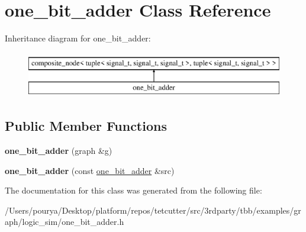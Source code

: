 \hypertarget{classone__bit__adder}{}\section{one\+\_\+bit\+\_\+adder Class Reference}
\label{classone__bit__adder}
Inheritance diagram for one\+\_\+bit\+\_\+adder\+:\begin{figure}[H]
\begin{center}
\leavevmode
\includegraphics[height=2.000000cm]{classone__bit__adder}
\end{center}
\end{figure}
\subsection*{Public Member Functions}
\begin{DoxyCompactItemize}
\item 
\hypertarget{classone__bit__adder_a98c1e1dfb1f1b4c7cf755eb5d6381bca}{}{\bfseries one\+\_\+bit\+\_\+adder} (graph \&g)\label{classone__bit__adder_a98c1e1dfb1f1b4c7cf755eb5d6381bca}

\item 
\hypertarget{classone__bit__adder_a69045764543d58db25c990690d3b2a0a}{}{\bfseries one\+\_\+bit\+\_\+adder} (const \hyperlink{classone__bit__adder}{one\+\_\+bit\+\_\+adder} \&src)\label{classone__bit__adder_a69045764543d58db25c990690d3b2a0a}

\end{DoxyCompactItemize}


The documentation for this class was generated from the following file\+:\begin{DoxyCompactItemize}
\item 
/\+Users/pourya/\+Desktop/platform/repos/tetcutter/src/3rdparty/tbb/examples/graph/logic\+\_\+sim/one\+\_\+bit\+\_\+adder.\+h\end{DoxyCompactItemize}
